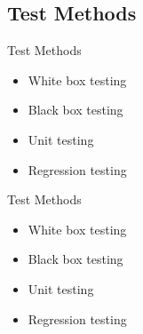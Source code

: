 \subsection{Test Methods}
\begin{frame}{Test Methods}
	\begin{itemize}
		\item White box testing
		\item Black box testing
		\item Unit testing
		\item Regression testing
	\end{itemize}
\end{frame}

\begin{frame}{Test Methods}
	\begin{itemize}
		\item White box testing
		\item Black box testing
		\item Unit testing
		\item Regression testing
	\end{itemize}
\end{frame}